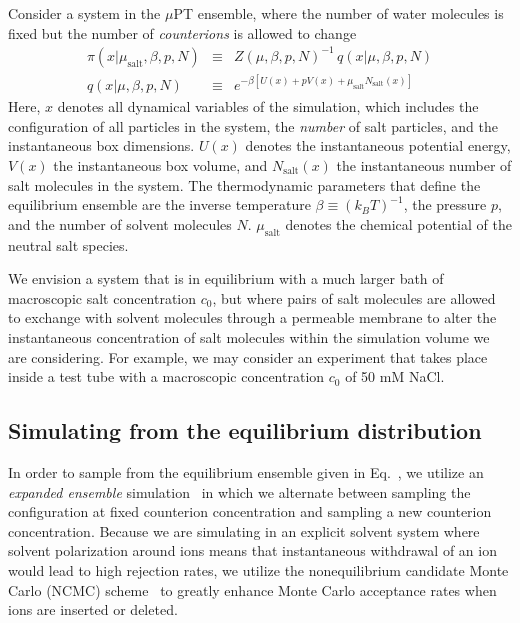 \documentclass[aps,pre,twocolumn,nofootinbib,superscriptaddress,linenumbers,11point]{revtex4-1}
\begin{document}
Consider a system in the $\mu$PT ensemble, where the number of water molecules is fixed but the number of \emph{counterions} is allowed to change
\begin{eqnarray}
\pi(x | \mu_\mathrm{salt}, \beta, p, N) &\equiv& Z(\mu, \beta, p, N)^{-1} \, q(x | \mu, \beta, p, N) \\
q(x | \mu, \beta, p, N) &\equiv& e^{ - \beta \left[ U(x) + p V(x) + \mu_\mathrm{salt} N_\mathrm{salt}(x) \right] } \label{equation:semigrand-canonical-ensemble}
\end{eqnarray}
Here, $x$ denotes all dynamical variables of the simulation, which includes the configuration of all particles in the system, the \emph{number} of salt particles, and the instantaneous box dimensions.
$U(x)$ denotes the instantaneous potential energy, $V(x)$ the instantaneous box volume, and $N_\mathrm{salt}(x)$ the instantaneous number of salt molecules in the system.
The thermodynamic parameters that define the equilibrium ensemble are the inverse temperature $\beta \equiv (k_B T)^{-1}$, the pressure $p$, and the number of solvent molecules $N$.
$\mu_\mathrm{salt}$ denotes the chemical potential of the neutral salt species.

We envision a system that is in equilibrium with a much larger bath of macroscopic salt concentration $c_0$, but where pairs of salt molecules are allowed to exchange with solvent molecules through a permeable membrane to alter the instantaneous concentration of salt molecules within the simulation volume we are considering.
For example, we may consider an experiment that takes place inside a test tube with a macroscopic concentration $c_0$ of 50 mM NaCl.

\subsection*{Simulating from the equilibrium distribution}

In order to sample from the equilibrium ensemble given in Eq.~\label{equation:semigrand-canonical-ensemble}, we utilize an \emph{expanded ensemble} simulation~\cite{lyubartsev:1992a} in which we alternate between sampling the configuration at fixed counterion concentration and sampling a new counterion concentration.
Because we are simulating in an explicit solvent system where solvent polarization around ions means that instantaneous withdrawal of an ion would lead to high rejection rates, we utilize the nonequilibrium candidate Monte Carlo (NCMC) scheme~\cite{ncmc} to greatly enhance Monte Carlo acceptance rates when ions are inserted or deleted.
\end{document}
